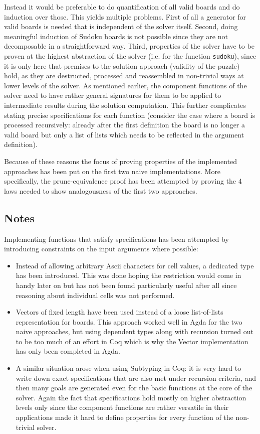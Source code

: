 \documentclass[a4paper,11pt]{article}
\begin{document}
Instead it would be preferable to do quantification of all valid boards and do induction over those. This yields multiple problems. First of all a generator for valid boards is needed that is independent of the solver itself. Second, doing meaningful induction of Sudoku boards is not possible since they are not decomposable in a straightforward way. Third, properties of the solver have to be proven at the highest abstraction of the solver (i.e. for the function \texttt{sudoku}), since it is only here that premises to the solution approach (validity of the puzzle) hold, as they are destructed, processed and reassembled in non-trivial ways at lower levels of the solver. As mentioned earlier, the component functions of the solver need to have rather general signatures for them to be applied to intermediate results during the solution computation. This further complicates stating precise specifications for each function (consider the case where a board is processed recursively: already after the first definition the board is no longer a valid board but only a list of lists which needs to be reflected in the argument definition).

Because of these reasons the focus of proving properties of the implemented approaches has been put on the first two naive implementations. More specifically, the prune-equivalence proof has been attempted by proving the 4 laws needed to show analogousness of the first two approaches. 

\subsection{Notes}
Implementing functions that satisfy specifications has been attempted by introducing constraints on the input arguments where possible:
\begin{itemize}
  \item Instead of allowing arbitrary Ascii characters for cell values, a dedicated type has been introduced. This was done hoping the restriction would come in handy later on but has not been found particularly useful after all since reasoning about individual cells was not performed.
  \item Vectors of fixed length have been used instead of a loose list-of-lists representation for boards. This approach worked well in Agda for the two naive approaches, but using dependent types along with recursion turned out to be too much of an effort in Coq which is why the Vector implementation has only been completed in Agda.
  \item A similar situation arose when using Subtyping in Coq: it is very hard to write down exact specifications that are also met under recursion criteria, and then many goals are generated even for the basic functions at the core of the solver. Again the fact that specifications hold mostly on higher abstraction levels only since the component functions are rather versatile in their applications made it hard to define properties for every function of the non-trivial solver.
\end{itemize}
\end{document}
